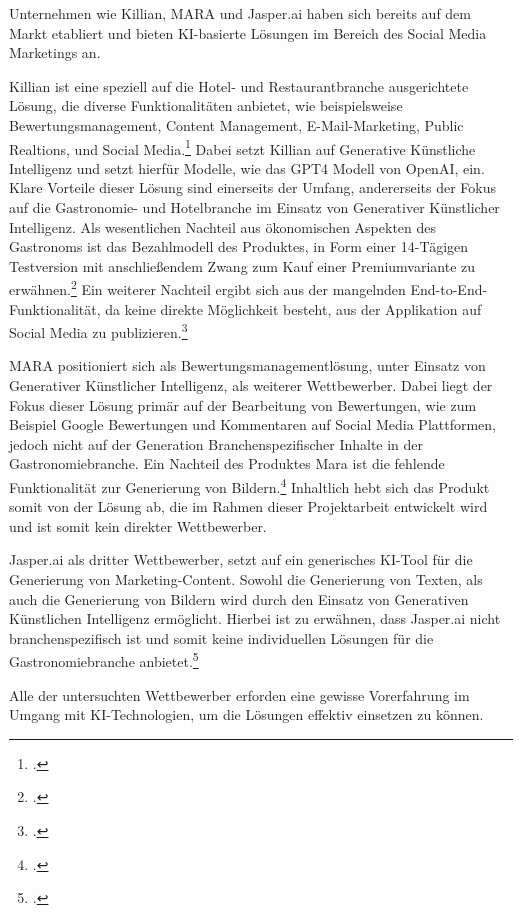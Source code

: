 Unternehmen wie Killian, MARA und Jasper.ai haben sich bereits auf dem Markt etabliert und bieten KI-basierte Lösungen im Bereich des Social Media Marketings an.

Killian ist eine speziell auf die Hotel- und Restaurantbranche ausgerichtete Lösung, die diverse Funktionalitäten anbietet, wie beispielsweise Bewertungsmanagement, Content Management, E-Mail-Marketing, Public Realtions, und Social Media.\footcite{kilian_ai_produkt}
Dabei setzt Killian auf Generative Künstliche Intelligenz und setzt hierfür Modelle, wie das GPT4 Modell von OpenAI, ein.
Klare Vorteile dieser Lösung sind einerseits der Umfang, andererseits der Fokus auf die Gastronomie- und Hotelbranche im Einsatz von Generativer Künstlicher Intelligenz.
Als wesentlichen Nachteil aus ökonomischen Aspekten des Gastronoms ist das Bezahlmodell des Produktes, in Form einer 14-Tägigen Testversion mit anschließendem Zwang zum Kauf einer Premiumvariante zu erwähnen.\footcite{kilian_ai_preise}
Ein weiterer Nachteil ergibt sich aus der mangelnden End-to-End-Funktionalität, da keine direkte Möglichkeit besteht, aus der Applikation auf Social Media zu publizieren.\footcite{kilian_ai_funktionen}

MARA positioniert sich als Bewertungsmanagementlösung, unter Einsatz von Generativer Künstlicher Intelligenz, als weiterer Wettbewerber.
Dabei liegt der Fokus dieser Lösung primär auf der Bearbeitung von Bewertungen, wie zum Beispiel Google Bewertungen und Kommentaren auf Social Media Plattformen, jedoch nicht auf der Generation Branchenspezifischer Inhalte in der Gastronomiebranche.
Ein Nachteil des Produktes Mara ist die fehlende Funktionalität zur Generierung von Bildern.\footcite{mara_solutions_features}
Inhaltlich hebt sich das Produkt somit von der Lösung ab, die im Rahmen dieser Projektarbeit entwickelt wird und ist somit kein direkter Wettbewerber.

Jasper.ai als dritter Wettbewerber, setzt auf ein generisches KI-Tool für die Generierung von Marketing-Content.
Sowohl die Generierung von Texten, als auch die Generierung von Bildern wird durch den Einsatz von Generativen Künstlichen Intelligenz ermöglicht.
Hierbei ist zu erwähnen, dass Jasper.ai nicht branchenspezifisch ist und somit keine individuellen Lösungen für die Gastronomiebranche anbietet.\footcite{jasper_ai_product_marketers}

Alle der untersuchten Wettbewerber erforden eine gewisse Vorerfahrung im Umgang mit KI-Technologien, um die Lösungen effektiv einsetzen zu können.

